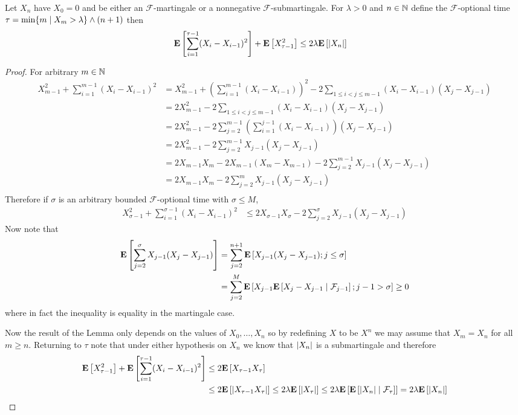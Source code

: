 \begin{lem}\label{BurkholderInequalityLemma1}Let $X_n$ have $X_0=0$ and be either an $\mathcal{F}$-martingale or a nonnegative $\mathcal{F}$-submartingale.  For $\lambda > 0$ and
$n \in \naturals$ define the $\mathcal{F}$-optional time $\tau = \min \lbrace m \mid X_m > \lambda  \rbrace \minop (n+1)$ then
\begin{align*}
\expectation{\sum_{i=1}^{\tau-1} (X_i - X_{i-1})^2} + \expectation{X_{\tau-1}^2} &\leq 2 \lambda \expectation{\abs{X_n}}
\end{align*}
\end{lem}
\begin{proof}
For arbitrary $m \in \naturals$ 
\begin{align*}
X_{m-1}^2 + \sum_{i=1}^{m-1} (X_i - X_{i-1})^2 &= X_{m-1}^2 + \left( \sum_{i=1}^{m-1} (X_i - X_{i-1})  \right)^2 - 2 \sum_{1 \leq i < j \leq m-1} (X_i - X_{i-1})  (X_j - X_{j-1})  \\
&= 2 X_{m-1}^2 - 2 \sum_{1 \leq i < j \leq m-1} (X_i - X_{i-1})  (X_j - X_{j-1})  \\
&= 2 X_{m-1}^2 - 2 \sum_{j=2}^{m-1} \left ( \sum_{i=1}^{j-1} (X_i - X_{i-1}) \right) (X_j - X_{j-1})  \\
&= 2 X_{m-1}^2 - 2 \sum_{j=2}^{m-1} X_{j-1} (X_j - X_{j-1})  \\
&= 2 X_{m-1} X_m -2X_{m-1} (X_m - X_{m-1}) - 2 \sum_{j=2}^{m-1} X_{j-1} (X_j - X_{j-1})  \\
&= 2 X_{m-1} X_m  - 2 \sum_{j=2}^{m} X_{j-1} (X_j - X_{j-1})  \\
\end{align*}
Therefore if $\sigma$ is an arbitrary bounded $\mathcal{F}$-optional time with $\sigma \leq M$,
\begin{align*}
X_{\sigma-1}^2 + \sum_{i=1}^{\sigma-1} (X_i - X_{i-1})^2 &\leq 2 X_{\sigma-1} X_\sigma  - 2 \sum_{j=2}^{\sigma} X_{j-1} (X_j - X_{j-1})  
\end{align*}
Now note that 
\begin{align*}
\expectation{\sum_{j=2}^{\sigma} X_{j-1} (X_j - X_{j-1}) } &= \sum_{j=2}^{n+1 }\expectation{ X_{j-1} (X_j - X_{j-1}) ; j \leq \sigma } \\
&=\sum_{j=2}^{M}\expectation{ X_{j-1} \cexpectationlong{\mathcal{F}_{j-1}}{X_j - X_{j-1}} ; j-1 > \sigma } \geq 0
\end{align*}
where in fact the inequality is equality in the martingale case.

Now the result of the Lemma only depends on the values of $X_0, \dotsc, X_n$ so by redefining $X$ to be $X^n$ we may assume that $X_m = X_n$ for all $m \geq n$.  Returning to $\tau$ note that under either hypothesis on $X_n$ we know that $\abs{X_n}$ is a submartingale and therefore
\begin{align*}
\expectation{X_{\tau-1}^2} + \expectation{\sum_{i=1}^{\tau-1} (X_i - X_{i-1})^2} &\leq 2 \expectation{X_{\tau-1} X_\tau} \\
&\leq 2 \expectation{\abs{X_{\tau-1} X_\tau}}  \leq  2 \lambda \expectation{\abs{X_\tau}}\leq 2 \lambda \expectation{\cexpectationlong{\mathcal{F}_\tau}{\abs{X_n}}} = 
2 \lambda \expectation{\abs{X_n}}
\end{align*}
\end{proof}

